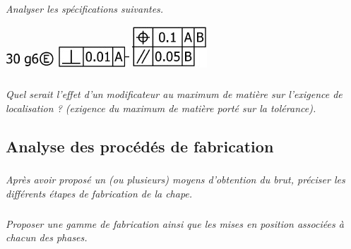 \documentclass[10pt,fleqn]{article} %
\begin{document}
\begin{multicols}{2}
\subparagraph{}\textit{Analyser les spécifications suivantes.}

\begin{center}
\includegraphics[width=.25\linewidth]{images/gps_01}
\hfill
\includegraphics[width=.3\linewidth]{images/gps_02}
\hfill
\includegraphics[width=.3\linewidth]{images/gps_03}
\end{center}

\subparagraph{}\textit{Quel serait l'effet d'un modificateur au maximum de matière sur l'exigence de localisation ? (exigence du maximum de matière porté sur la tolérance).}


\subsection*{Analyse des procédés de fabrication}

\subparagraph{}\textit{Après avoir proposé un (ou plusieurs) moyens d'obtention du brut, préciser les différents étapes de fabrication de la chape.}

\subparagraph{}\textit{Proposer une gamme de fabrication ainsi que les mises en position associées à chacun des phases.}



\end{multicols}
\end{document}
